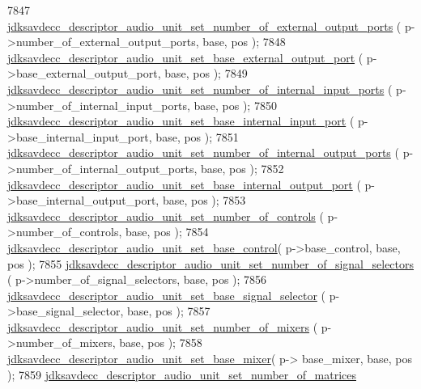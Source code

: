\begin{DoxyCode}
7847         \hyperlink{group__descriptor__audio_gaa8e789eb58ac6e888e94a01a57d8fa05}{jdksavdecc\_descriptor\_audio\_unit\_set\_number\_of\_external\_output\_ports}
      ( p->number\_of\_external\_output\_ports, base, pos );
7848         \hyperlink{group__descriptor__audio_ga4f4378c7c69e72d3670ba5f58c8a3e43}{jdksavdecc\_descriptor\_audio\_unit\_set\_base\_external\_output\_port}
      ( p->base\_external\_output\_port, base, pos );
7849         \hyperlink{group__descriptor__audio_gab25473ecc94044e36d5747cc379aab06}{jdksavdecc\_descriptor\_audio\_unit\_set\_number\_of\_internal\_input\_ports}
      ( p->number\_of\_internal\_input\_ports, base, pos );
7850         \hyperlink{group__descriptor__audio_gaf7ddda9ae178313c6f64a083d9fc4fb1}{jdksavdecc\_descriptor\_audio\_unit\_set\_base\_internal\_input\_port}
      ( p->base\_internal\_input\_port, base, pos );
7851         \hyperlink{group__descriptor__audio_ga2492dcb566024f8324164c5c0d908302}{jdksavdecc\_descriptor\_audio\_unit\_set\_number\_of\_internal\_output\_ports}
      ( p->number\_of\_internal\_output\_ports, base, pos );
7852         \hyperlink{group__descriptor__audio_gaf43b0352707be48aca5252c2efeb9b6c}{jdksavdecc\_descriptor\_audio\_unit\_set\_base\_internal\_output\_port}
      ( p->base\_internal\_output\_port, base, pos );
7853         \hyperlink{group__descriptor__audio_gaaf686592bbcbd17e9fa1f01ce283903a}{jdksavdecc\_descriptor\_audio\_unit\_set\_number\_of\_controls}
      ( p->number\_of\_controls, base, pos );
7854         \hyperlink{group__descriptor__audio_ga0350d12ff4567b3e8925c3426a6b74bb}{jdksavdecc\_descriptor\_audio\_unit\_set\_base\_control}(
       p->base\_control, base, pos );
7855         \hyperlink{group__descriptor__audio_gab2e755e52950a3b85803d78e981f113c}{jdksavdecc\_descriptor\_audio\_unit\_set\_number\_of\_signal\_selectors}
      ( p->number\_of\_signal\_selectors, base, pos );
7856         \hyperlink{group__descriptor__audio_gadb27a83d26fbc306e1cf8c641e91c860}{jdksavdecc\_descriptor\_audio\_unit\_set\_base\_signal\_selector}
      ( p->base\_signal\_selector, base, pos );
7857         \hyperlink{group__descriptor__audio_ga81a400b31de2387af3c1ddc955b6c0b3}{jdksavdecc\_descriptor\_audio\_unit\_set\_number\_of\_mixers}
      ( p->number\_of\_mixers, base, pos );
7858         \hyperlink{group__descriptor__audio_ga7d435a7a0229e44e97eedbe0cfbb54a1}{jdksavdecc\_descriptor\_audio\_unit\_set\_base\_mixer}( p->
      base\_mixer, base, pos );
7859         \hyperlink{group__descriptor__audio_gaf257c181e37bd0afb7727d43791cd3b3}{jdksavdecc\_descriptor\_audio\_unit\_set\_number\_of\_matrices}

\end{DoxyCode}
